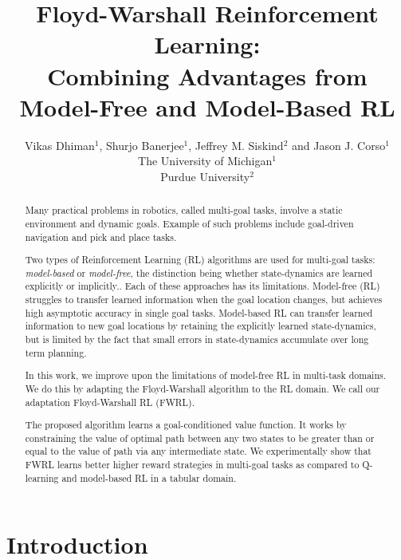 \documentclass[letterpaper]{article} %
\title{Floyd-Warshall Reinforcement Learning: \\Combining Advantages from
Model-Free and Model-Based RL}
\author{Vikas Dhiman$^1$, Shurjo Banerjee$^1$, Jeffrey M. Siskind$^2$ and Jason J.
Corso$^1$\\
The University of Michigan$^1$\\
Purdue University$^2$}
\begin{document}
\maketitle
\begin{abstract}
Many practical problems in robotics, called multi-goal tasks, involve a static environment and dynamic goals.
Example of such problems include goal-driven navigation and pick and place
tasks.

Two types of Reinforcement Learning (RL) algorithms are used for
multi-goal tasks: 
\emph{model-based} or \emph{model-free}, the distinction being whether state-dynamics are
learned explicitly or implicitly.. Each of these approaches has its limitations.
Model-free (RL) struggles to transfer learned information when the goal location
changes, but achieves high asymptotic accuracy in single goal tasks. Model-based
RL can transfer learned information to new goal locations by retaining the
explicitly learned state-dynamics, but is limited by the fact that small errors in
state-dynamics accumulate over long term planning.

In this work, we improve upon the limitations of model-free RL in
multi-task domains. 
We do this by adapting the Floyd-Warshall algorithm to
the RL domain. We call our adaptation Floyd-Warshall RL (FWRL).

The proposed algorithm learns a goal-conditioned value function. 
It works by constraining the value of
optimal path between any two states to be greater than or equal to the value of
path via any intermediate state.
We experimentally show that FWRL learns better higher reward strategies in
multi-goal tasks as compared to Q-learning and model-based RL in a
tabular domain.
\end{abstract}


\section{ Introduction}



%













%
\end{document}
